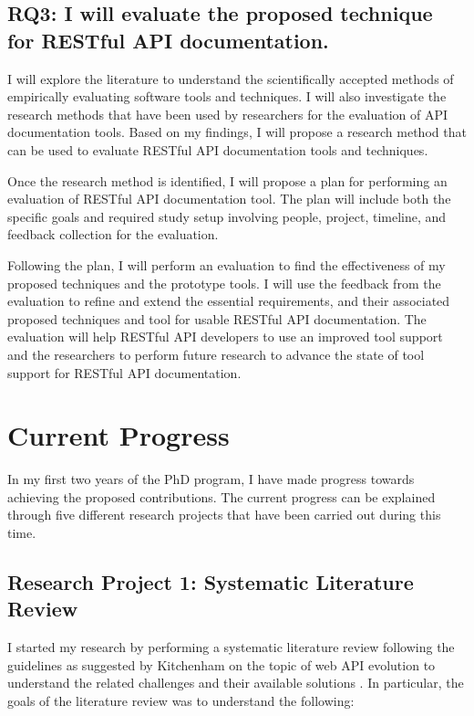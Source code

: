 \documentclass[11pt,oneside]{book}
\begin{document}
\section{RQ3: I will evaluate the proposed technique for RESTful API documentation.}

I will explore the literature to understand the scientifically accepted methods of empirically evaluating software tools and techniques. I will also investigate the research methods that have been used by researchers for the evaluation of API documentation tools. Based on my findings, I will propose a research method that can be used to evaluate RESTful API documentation tools and techniques.

Once the research method is identified, I will propose a plan for performing an evaluation of RESTful API documentation tool. The plan will include both the specific goals and required study setup involving people, project, timeline, and feedback collection for the evaluation.

Following the plan, I will perform an evaluation to find the effectiveness of my proposed techniques and the prototype tools. I will use the feedback from the evaluation to refine and extend the essential requirements, and their associated proposed techniques and tool for usable RESTful API documentation. The evaluation will help RESTful API developers to use an improved tool support and the researchers to perform future research to advance the state of tool support for RESTful API documentation.

\chapter{Current Progress}

In my first two years of the PhD program, I have made progress towards achieving the proposed contributions. The current progress can be explained through five different research projects that have been carried out during this time.

\section{Research Project 1: Systematic Literature Review}
I started my research by performing a systematic literature review following the guidelines as suggested by Kitchenham on the topic of web API evolution to understand the related challenges and their available solutions \cite{kitchenham2007guidelines}. In particular, the goals of the literature review was to understand the following:
\end{document}
